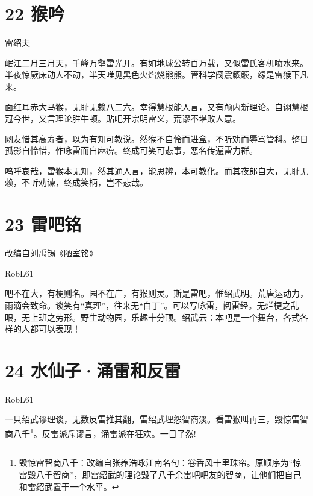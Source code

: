 \documentclass[UTF8,12pt,oneside]{ctexbook}
\begin{document}
    \newpage
    
    \section{22 猴吟}
    \begin{center}    
        雷绍夫
    \end{center}
        
        岷江二月三月天，千峰万壑雷光开。有如地球公转百万载，又似雷氏客机喷水来。半夜惊厥床动人不动，半天唯见黑色火焰烧熊熊。管科学阀震簌簌，缘是雷猴下凡来。
        
        面红耳赤大马猴，无耻无赖八二六。幸得慧根能人言，又有颅内新理论。自诩慧根冠今世，又言理论胜牛顿。贴吧开宗明雷义，荒谬不堪败人意。
        
        网友惜其高寿者，以为有知可教说。然猴不自怜而进盒，不听劝而辱骂管科。整日孤影自怜惜，作咏雷而自麻痹。终成可笑可悲事，恶名传遍雷力群。
        
        呜呼哀哉，雷猴本无知，然其通人言，能思辨，本可教化。而其夜郎自大，无耻无赖，不听劝谏，终成笑柄，岂不悲哉。
        
    \section{23 雷吧铭}
        \begin{center}
        \Large \kaishu
        改编自刘禹锡《陋室铭》
        \songti \large
        
        RobL61
        \end{center}
        
        吧不在大，有梗则名。园不在广，有猴则灵。斯是雷吧，惟绍武明。荒唐运动力，雨滴会致命。谈笑有“真理”，往来无“白丁”。可以写咏雷，阅雷经。无烂梗之乱眼，无上班之劳形。野生动物园，乐趣十分顶。绍武云：本吧是一个舞台，各式各样的人都可以表现！
        
    \newpage
        
    \section{24 水仙子·涌雷和反雷}
        \begin{center}
        RobL61
        \end{center}
        
        一只绍武谬理谈，无数反雷推其翻，雷绍武埋怨智商淡。看雷猴叫再三，毁惊雷智商八千\footnote{毁惊雷智商八千：改编自张养浩咏江南名句：卷香风十里珠帘。原顺序为“惊雷毁八千智商”，即雷绍武的理论毁了八千余雷吧吧友的智商，让他们把自己和雷绍武置于一个水平。}。反雷派斥谬言，涌雷派在狂欢。一目了然!
    
\end{document}
